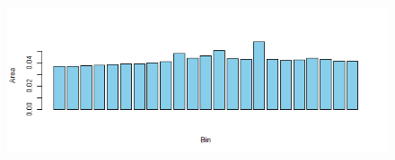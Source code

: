 \documentclass[11pt]{article}
\theoremstyle{plain}
\theoremstyle{definition}
\begin{document}
\begin{figure}[H]
\begin{center}
\includegraphics[trim ={3.5cm 2.7cm 2cm 2cm},scale=.6, clip=true]{Binned_Areas34.png}
\end{center}
\end{figure}
\end{document}
